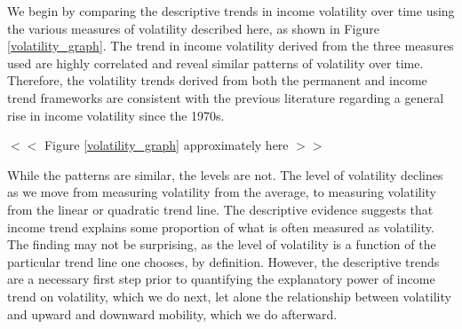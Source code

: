 \documentclass[12pt]{article}
\begin{document}
We begin by comparing the descriptive trends in income volatility over time using the various measures of volatility described here, as shown in Figure \ref{volatility_graph}. The trend in income volatility derived from the three measures used are highly correlated and reveal similar patterns of volatility over time. Therefore, the volatility trends derived from both the permanent and income trend frameworks are consistent with the previous literature regarding a general rise in income volatility since the 1970s.
\begin{center}
$<<$ Figure \ref{volatility_graph} approximately here $>>$ 
\end{center}
While the patterns are similar, the levels are not. The level of volatility declines as we move from measuring volatility from the average, to measuring volatility from the linear or quadratic trend line. The descriptive evidence suggests that income trend explains some proportion of what is often measured as volatility. The finding may not be surprising, as the level of volatility is a function of the particular trend line one chooses, by definition. However, the descriptive trends are a necessary first step prior to quantifying the explanatory power of income trend on volatility, which we do next, let alone the relationship between volatility and upward and downward mobility, which we do afterward.
\end{document}
